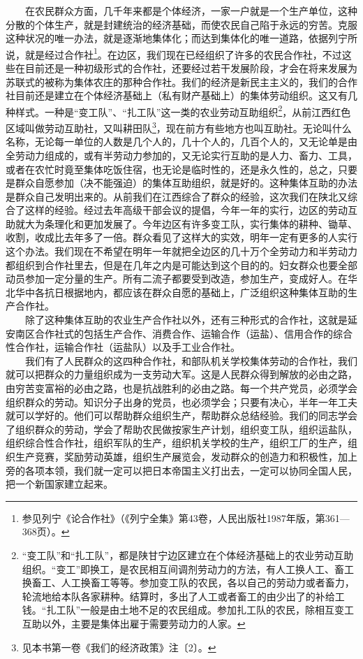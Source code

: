 \documentclass[cn,11pt,chinese]{elegantbook}
\begin{document}
　　在农民群众方面，几千年来都是个体经济，一家一户就是一个生产单位，这种分散的个体生产，就是封建统治的经济基础，而使农民自己陷于永远的穷苦。克服这种状况的唯一办法，就是逐渐地集体化；而达到集体化的唯一道路，依据列宁所说，就是经过合作社\footnote[3]{ 参见列宁《论合作社》（《列宁全集》第43卷，人民出版社1987年版，第361—368页）。}。在边区，我们现在已经组织了许多的农民合作社，不过这些在目前还是一种初级形式的合作社，还要经过若干发展阶段，才会在将来发展为苏联式的被称为集体农庄的那种合作社。我们的经济是新民主主义的，我们的合作社目前还是建立在个体经济基础上（私有财产基础上）的集体劳动组织。这又有几种样式。一种是“变工队”、“扎工队”这一类的农业劳动互助组织\footnote[4]{ “变工队”和“扎工队”，都是陕甘宁边区建立在个体经济基础上的农业劳动互助组织。“变工”即换工，是农民相互间调剂劳动力的方法，有人工换人工、畜工换畜工、人工换畜工等等。参加变工队的农民，各以自己的劳动力或者畜力，轮流地给本队各家耕种。结算时，多出了人工或者畜工的由少出了的补给工钱。“扎工队”一般是由土地不足的农民组成。参加扎工队的农民，除相互变工互助以外，主要是集体出雇于需要劳动力的人家。}，从前江西红色区域叫做劳动互助社，又叫耕田队\footnote[5]{ 见本书第一卷《我们的经济政策》注〔2〕。}，现在前方有些地方也叫互助社。无论叫什么名称，无论每一单位的人数是几个人的，几十个人的，几百个人的，又无论单是由全劳动力组成的，或有半劳动力参加的，又无论实行互助的是人力、畜力、工具，或者在农忙时竟至集体吃饭住宿，也无论是临时性的，还是永久性的，总之，只要是群众自愿参加（决不能强迫）的集体互助组织，就是好的。这种集体互助的办法是群众自己发明出来的。从前我们在江西综合了群众的经验，这次我们在陕北又综合了这样的经验。经过去年高级干部会议的提倡，今年一年的实行，边区的劳动互助就大为条理化和更加发展了。今年边区有许多变工队，实行集体的耕种、锄草、收割，收成比去年多了一倍。群众看见了这样大的实效，明年一定有更多的人实行这个办法。我们现在不希望在明年一年就把全边区的几十万个全劳动力和半劳动力都组织到合作社里去，但是在几年之内是可能达到这个目的的。妇女群众也要全部动员参加一定分量的生产。所有二流子都要受到改造，参加生产，变成好人。在华北华中各抗日根据地内，都应该在群众自愿的基础上，广泛组织这种集体互助的生产合作社。\\
　　除了这种集体互助的农业生产合作社以外，还有三种形式的合作社，这就是延安南区合作社式的包括生产合作、消费合作、运输合作（运盐）、信用合作的综合性合作社，运输合作社（运盐队）以及手工业合作社。\\
　　我们有了人民群众的这四种合作社，和部队机关学校集体劳动的合作社，我们就可以把群众的力量组织成为一支劳动大军。这是人民群众得到解放的必由之路，由穷苦变富裕的必由之路，也是抗战胜利的必由之路。每一个共产党员，必须学会组织群众的劳动。知识分子出身的党员，也必须学会；只要有决心，半年一年工夫就可以学好的。他们可以帮助群众组织生产，帮助群众总结经验。我们的同志学会了组织群众的劳动，学会了帮助农民做按家生产计划，组织变工队，组织运盐队，组织综合性合作社，组织军队的生产，组织机关学校的生产，组织工厂的生产，组织生产竞赛，奖励劳动英雄，组织生产展览会，发动群众的创造力和积极性，加上旁的各项本领，我们就一定可以把日本帝国主义打出去，一定可以协同全国人民，把一个新国家建立起来。\\
\end{document}
